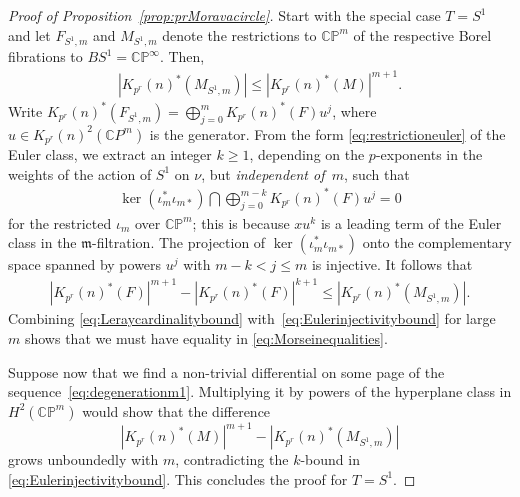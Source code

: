 \documentclass[11pt, reqno]{amsart}
\theoremstyle{plain}
\theoremstyle{definition}
\begin{document}
\begin{proof}[Proof of Proposition~\ref{prop:prMoravacircle}]
Start with the special case $T=S^1$ and let $F_{S^1,m}$ and $M_{S^1,m}$ denote the restrictions to 
$\mathbb{CP}^m$ of the respective Borel fibrations to $BS^1=\mathbb{CP}^\infty$. Then,  
\begin{align} 
\label{eq:Leraycardinalitybound} 
|K_{p^r}(n)^*(M_{S^1,m})| \leq |K_{p^r}(n)^*(M)|^{m+1}. 
\end{align} 
Write $K_{p^r}(n)^*(F_{S^1,m})=\bigoplus_{j=0}^m K_{p^r}(n)^*(F)u^j$,  where 
$u \in K_{p^r}(n)^2(\mathbb{C}P^m)$ is the generator.  From the form \eqref{eq:restrictioneuler} of the 
Euler class, we extract an integer $k \geq 1$, depending on the $p$-exponents in the weights of 
the action of $S^1$ on $\nu$, but \emph{independent of~$m$}, such that 
\begin{align} 
\label{eq:kernelbound} 
\operatorname{ker}(\iota_m^* \iota_{m*}) \bigcap 
	\bigoplus_{j=0}^{m-k} K_{p^r}(n)^*(F)u^j = 0
\end{align}  
for the restricted $\iota_m$ over $\mathbb{CP}^m$; this is because $xu^k$ is a leading term of the Euler 
class in the $\mathfrak{m}$-filtration. The projection of 
$\operatorname{ker}(\iota_m^* \iota_{m*})$ 
onto the complementary space spanned by powers $u^j$ with 
$m-k< j\le m$ is injective. It follows that
\begin{align}
\label{eq:Eulerinjectivitybound} |K_{p^r}(n)^*(F)|^{m+1}-|K_{p^r}(n)^*(F)|^{k+1} \leq |K_{p^r}(n)^*(M_{S^1,m})|.  
\end{align} 
Combining \eqref{eq:Leraycardinalitybound} with~\eqref{eq:Eulerinjectivitybound} for large $m$ 
shows that we must have equality in \eqref{eq:Morseinequalities}. 

Suppose now that we find a non-trivial differential on some page of the 
sequence~\eqref{eq:degenerationm1}.  Multiplying it  by  powers of the hyperplane class in
$H^2(\mathbb{CP}^m)$ would show that the difference  
\[
|K_{p^r}(n)^*(M)|^{m+1}-|K_{p^r}(n)^*(M_{S^1,m})|
\] 
grows unboundedly with $m$,  contradicting the $k$-bound in \eqref{eq:Eulerinjectivitybound}. 
This concludes the proof for $T=S^1$.  


\end{proof}
\end{document}
